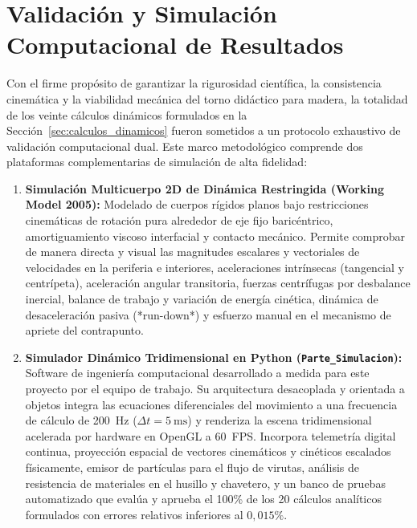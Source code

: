 
\section{Validación y Simulación Computacional de Resultados}
\label{sec:validacion_simulacion}

Con el firme propósito de garantizar la rigurosidad científica, la consistencia cinemática y la viabilidad mecánica del torno didáctico para madera, la totalidad de los veinte cálculos dinámicos formulados en la Sección~\ref{sec:calculos_dinamicos} fueron sometidos a un protocolo exhaustivo de validación computacional dual. Este marco metodológico comprende dos plataformas complementarias de simulación de alta fidelidad:
\begin{enumerate}[leftmargin=18pt, itemsep=4pt, parsep=2pt]
    \item \textbf{Simulación Multicuerpo 2D de Dinámica Restringida (Working Model 2005):} Modelado de cuerpos rígidos planos bajo restricciones cinemáticas de rotación pura alrededor de eje fijo baricéntrico, amortiguamiento viscoso interfacial y contacto mecánico. Permite comprobar de manera directa y visual las magnitudes escalares y vectoriales de velocidades en la periferia e interiores, aceleraciones intrínsecas (tangencial y centrípeta), aceleración angular transitoria, fuerzas centrífugas por desbalance inercial, balance de trabajo y variación de energía cinética, dinámica de desaceleración pasiva (*run-down*) y esfuerzo manual en el mecanismo de apriete del contrapunto.
    \item \textbf{Simulador Dinámico Tridimensional en Python (\texttt{Parte\_Simulacion}):} Software de ingeniería computacional desarrollado a medida para este proyecto por el equipo de trabajo. Su arquitectura desacoplada y orientada a objetos integra las ecuaciones diferenciales del movimiento a una frecuencia de cálculo de \SI{200}{\hertz} ($\Delta t = \SI{5}{\milli\second}$) y renderiza la escena tridimensional acelerada por hardware en OpenGL a \SI{60}{FPS}. Incorpora telemetría digital continua, proyección espacial de vectores cinemáticos y cinéticos escalados físicamente, emisor de partículas para el flujo de virutas, análisis de resistencia de materiales en el husillo y chavetero, y un banco de pruebas automatizado que evalúa y aprueba el 100\% de los 20 cálculos analíticos formulados con errores relativos inferiores al $0{,}015\%$.
\end{enumerate}

